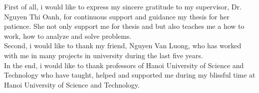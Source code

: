\begin{acknowledgement}



First of all, i would like to express my sincere gratitude to my supervisor, Dr. Nguyen Thi Oanh, for continuous support and guidance my thesis for her patience. She not only support me for thesis and but also teaches me a how to work, how to analyze and solve problems.\\
Second, i would like to thank my friend, Nguyen Van Luong, who has worked with me in many projects in university during the last five years.  \\
In the end, i would like to thank professors of Hanoi University of Science and Technology who have taught, helped and supported me during my blissful time at Hanoi University of Science and Technology. 



\end{acknowledgement}